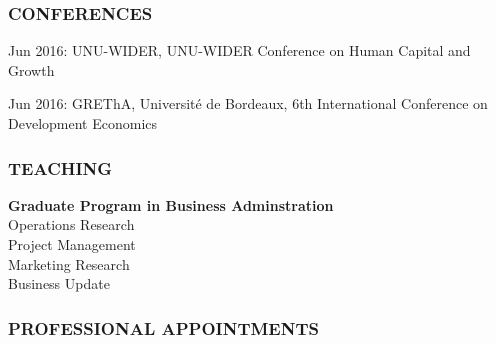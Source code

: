 \documentclass[12pt, a4paper]{article}
\begin{document}
	\subsubsection*{CONFERENCES} 
	 Jun 2016: UNU-WIDER, UNU-WIDER Conference on Human Capital and Growth
	\begin{hangparas}{0.8in}{1}
	 Jun 2016: GREThA, Universit\'{e} de Bordeaux, 6th International Conference on Development Economics
	\end{hangparas}	 
	
	
	\subsubsection*{TEACHING}
	\noindent\textbf{Graduate Program in Business Adminstration} \\
		Operations Research \\
		Project Management \\
		Marketing Research \\
		Business Update \\

	\subsubsection*{PROFESSIONAL APPOINTMENTS}
\end{document}
